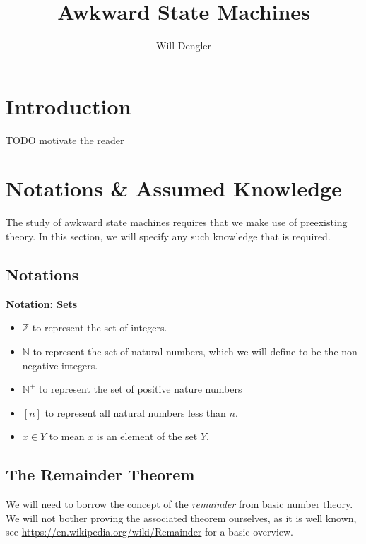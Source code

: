 \documentclass[a4paper,12pt]{article}
\begin{document}
\title{Awkward State Machines}
\author{Will Dengler}
\maketitle

\section{Introduction}
TODO motivate the reader
  
\section{Notations \& Assumed Knowledge}
\label{sec:assumed_knowledge}
The study of awkward state machines requires that we make use of preexisting theory. In this section, we will specify any such knowledge that is required.


\subsection{Notations}
\begin{tcolorbox}
\textbf{Notation: Sets}
\begin{itemize}
\item $\mathbb{Z}$ to represent the set of integers.
\item $\mathbb{N}$ to represent the set of natural numbers, which we will define to be the non-negative integers.
\item $\mathbb{N^{+}}$ to represent the set of positive nature numbers
\item $[n]$ to represent all natural numbers less than $n$.
\item $x \in Y$ to mean $x$ is an element of the set $Y$.
\end{itemize}
\end{tcolorbox}
\label{notation:sets}



\subsection{The Remainder Theorem}
We will need to borrow the concept of the \textit{remainder} from basic number theory. We will not bother proving the associated theorem ourselves, as it is well known, see \url{https://en.wikipedia.org/wiki/Remainder} for a basic overview.\\
\end{document}
